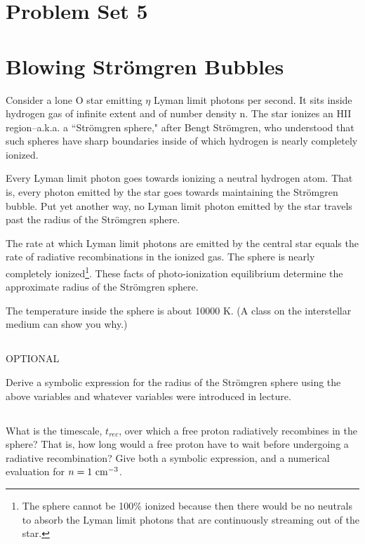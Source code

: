 \documentclass[11pt]{article}
\def\trec{{t_{rec}}}
\begin{document}
\pagestyle{empty}

\section*{\centering Problem Set 5}

\section{Blowing Str\"omgren Bubbles}\label{p2}

Consider a lone O star emitting $\eta$ Lyman limit photons per second. It sits
inside hydrogen gas of infinite extent and of number density n. The star
ionizes an HII region--a.k.a. a ``Str\"omgren sphere," after Bengt Str\"omgren, who
understood that such spheres have sharp boundaries inside of which hydrogen is nearly
completely ionized.

Every Lyman limit photon goes towards ionizing a neutral hydrogen atom. That
is, every photon emitted by the star goes towards maintaining the Str\"omgren
bubble. Put yet another way, no Lyman limit photon emitted by the star travels
past the radius of the Str\"omgren sphere.

The rate at which Lyman limit photons are emitted by the central star equals
the rate of radiative recombinations in the ionized gas. The sphere is nearly
completely ionized\footnote{The
sphere cannot be 100\% ionized because then there would be no neutrals to
absorb the Lyman limit photons that are continuously streaming out of the star.}.
These facts of photo-ionization equilibrium determine the
approximate radius of the Str\"omgren sphere.

The temperature inside the sphere is about 10000 K. (A class on the interstellar medium can show you why.)

\subsection{} OPTIONAL

Derive a symbolic expression for the radius of the Str\"omgren sphere using the
above variables and whatever variables were introduced in lecture.

\subsection{}\label{p2partb}

What is the timescale, $\trec$, over which a free proton radiatively recombines in
the sphere? That is, how long would a free proton have to wait before
undergoing a radiative recombination? Give both a symbolic expression, and a
numerical evaluation for $n = 1~{\rm cm}^{-3}$.
\end{document}
